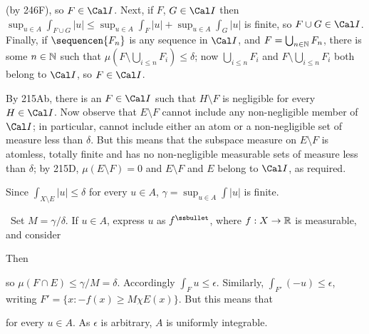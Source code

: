 {

\noindent (by 246F), so $F\in\Cal I$.   Next, if $F$, $G\in\Cal I$ then
$\sup_{u\in A}\int_{F\cup G}|u|
\le\sup_{u\in A}\int_F|u|+\sup_{u\in A}\int_G|u|$ is finite, so
$F\cup G\in \Cal I$.   Finally, if
$\sequencen{F_n}$ is any sequence in $\Cal I$, and
$F=\bigcup_{n\in\Bbb N}F_n$, there is some $n\in\Bbb N$ such that
$\mu(F\setminus\bigcup_{i\le n}F_i)\le\delta$;  now
$\bigcup_{i\le n}F_i$ and
$F\setminus\bigcup_{i\le n}F_i$ both belong to $\Cal I$, so
$F\in\Cal I$.

By 215Ab, there is an $F\in\Cal I$ such that $H\setminus F$ is
negligible for every $H\in\Cal I$.   Now observe that $E\setminus F$
cannot include any non-negligible member of $\Cal I$;  in particular,
cannot include either an atom or a non-negligible set of measure less
than $\delta$.   But this means that the subspace measure on
$E\setminus F$ is atomless, totally finite and has no non-negligible
measurable sets
of measure less than $\delta$;  by 215D, $\mu(E\setminus F)=0$ and
$E\setminus F$ and $E$ belong to $\Cal I$, as required.\ \Qed

Since $\int_{X\setminus E}|u|\le\delta$ for every $u\in A$,
$\gamma=\sup_{u\in A}\int|u|$ is finite.

\medskip

\quad\grheadb\
Set $M=\gamma/\delta$.   If $u\in A$, express $u$ as $f^{\ssbullet}$,
where $f:X\to\Bbb R$ is measurable, and consider


\noindent Then


\noindent so $\mu(F\cap E)\le\gamma/M=\delta$.   Accordingly
$\int_Fu\le\epsilon$.   Similarly, $\int_{F'}(-u)\le\epsilon$, writing
$F'=\{x:-f(x)\ge M\chi E(x)\}$.   But this means that


\noindent for every $u\in A$.  As $\epsilon$ is arbitrary, $A$ is
uniformly integrable.
}%

